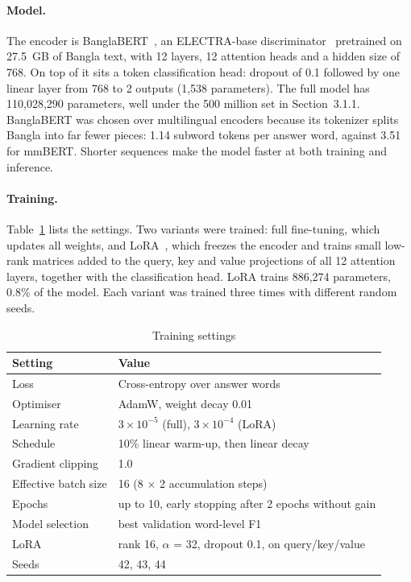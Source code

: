 \paragraph{Model.} The encoder is BanglaBERT~\cite{banglabert}, an ELECTRA-base
discriminator~\cite{electra} pretrained on 27.5~GB of Bangla text, with 12
layers, 12 attention heads and a hidden size of 768. On top of it sits a token
classification head: dropout of 0.1 followed by one linear layer from 768 to 2
outputs (1,538 parameters). The full model has 110,028,290 parameters, well
under the 500 million set in Section~3.1.1. BanglaBERT was chosen over
multilingual encoders because its tokenizer splits Bangla into far fewer pieces:
1.14 subword tokens per answer word, against 3.51 for mmBERT. Shorter sequences
make the model faster at both training and inference.

\paragraph{Training.} Table~\ref{tab:hyper} lists the settings. Two variants
were trained: full fine-tuning, which updates all weights, and LoRA~\cite{lora},
which freezes the encoder and trains small low-rank matrices added to the
query, key and value projections of all 12 attention layers, together with the
classification head. LoRA trains 886,274 parameters, 0.8\% of the model. Each
variant was trained three times with different random seeds.

\begin{table}[htbp]
\centering
\caption{Training settings}
\label{tab:hyper}
\begin{tabular}{ll}
\hline
\textbf{Setting} & \textbf{Value} \\
\hline
Loss & Cross-entropy over answer words \\
Optimiser & AdamW, weight decay 0.01 \\
Learning rate & $3\times10^{-5}$ (full), $3\times10^{-4}$ (LoRA) \\
Schedule & 10\% linear warm-up, then linear decay \\
Gradient clipping & 1.0 \\
Effective batch size & 16 (8 $\times$ 2 accumulation steps) \\
Epochs & up to 10, early stopping after 2 epochs without gain \\
Model selection & best validation word-level F1 \\
LoRA & rank 16, $\alpha$ = 32, dropout 0.1, on query/key/value \\
Seeds & 42, 43, 44 \\
\hline
\end{tabular}
\end{table}

